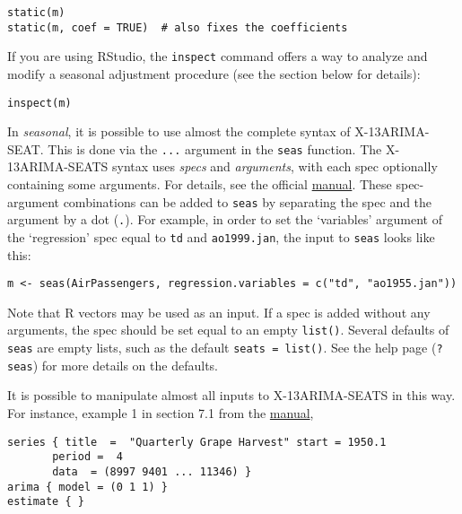 \begin{verbatim}
static(m)
static(m, coef = TRUE)  # also fixes the coefficients
\end{verbatim}

If you are using RStudio, the \texttt{inspect} command offers a way to
analyze and modify a seasonal adjustment procedure (see the section
below for details):

\begin{verbatim}
inspect(m)
\end{verbatim}


In \emph{seasonal}, it is possible to use almost the complete syntax of
X-13ARIMA-SEAT. This is done via the \texttt{...} argument in the
\texttt{seas} function. The X-13ARIMA-SEATS syntax uses \emph{specs} and
\emph{arguments}, with each spec optionally containing some arguments.
For details, see the official
\href{http://www.census.gov/ts/x13as/docX13AS.pdf}{manual}. These
spec-argument combinations can be added to \texttt{seas} by separating
the spec and the argument by a dot (\texttt{.}). For example, in order
to set the `variables' argument of the `regression' spec equal to
\texttt{td} and \texttt{ao1999.jan}, the input to \texttt{seas} looks
like this:

\begin{verbatim}
m <- seas(AirPassengers, regression.variables = c("td", "ao1955.jan"))
\end{verbatim}

Note that R vectors may be used as an input. If a spec is added without
any arguments, the spec should be set equal to an empty \texttt{list()}.
Several defaults of \texttt{seas} are empty lists, such as the default
\texttt{seats = list()}. See the help page (\texttt{?seas}) for more
details on the defaults.

It is possible to manipulate almost all inputs to X-13ARIMA-SEATS in
this way. For instance, example 1 in section 7.1 from the
\href{http://www.census.gov/ts/x13as/docX13AS.pdf}{manual},

\begin{verbatim}
series { title  =  "Quarterly Grape Harvest" start = 1950.1
       period =  4
       data  = (8997 9401 ... 11346) }
arima { model = (0 1 1) }
estimate { }
\end{verbatim}


